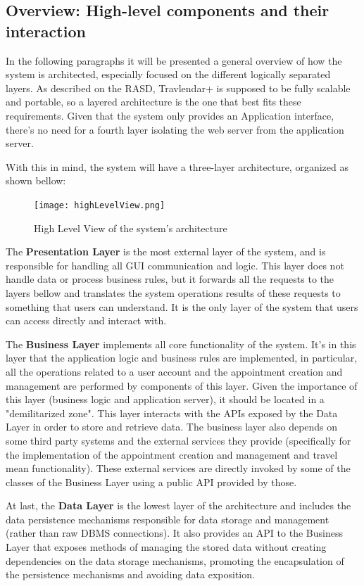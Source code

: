 \documentclass[12pt]{article}
\begin{document}
\subsection{Overview: High-level components and their interaction}

In the following paragraphs it will be presented a general overview of how the system is architected, especially focused on the different logically separated layers.
As described on the RASD, Travlendar+ is supposed to be fully scalable and portable, so a layered architecture is the one that best fits these requirements. Given that the system only provides an Application interface, there's no need for a fourth layer isolating the web server from the application server. 

With this in mind, the system will have a three-layer architecture, organized as shown bellow:
\begin{figure}[H]
    \centering
    \texttt{[image: highLevelView.png]}
    \caption{High Level View of the system's architecture}
    \label{fig:highLevelView}
\end{figure}
The \textbf{Presentation Layer} is the most external layer of the system, and is responsible for handling all GUI communication and logic. This layer does not handle data or process business rules, but it forwards all the requests to the layers bellow and translates the system operations results of these requests to something that users can understand. It is the only layer of the system that users can access directly and interact with.

The \textbf{Business Layer} implements all core functionality of the system. It's in this layer that the application logic and business rules are implemented, in particular, all the operations related to a user account and the appointment creation and management are performed by components of this layer. Given the importance of this layer (business logic and application server), it should be located in a "demilitarized zone". This layer interacts with the APIs exposed by the Data Layer in order to store and retrieve data. The business layer also depends on some third party systems and the external services they provide (specifically for the implementation of the appointment creation and management and travel mean functionality). These external services are directly invoked by some of the classes of the Business Layer using a public API provided by those.

At last, the \textbf{Data Layer} is the lowest layer of the architecture and includes the data persistence mechanisms responsible for data storage and management (rather than raw DBMS connections). It also provides an API to the Business Layer that exposes methods of managing the stored data without creating dependencies on the data storage mechanisms, promoting the encapsulation of the persistence mechanisms and avoiding data exposition. 
\end{document}
